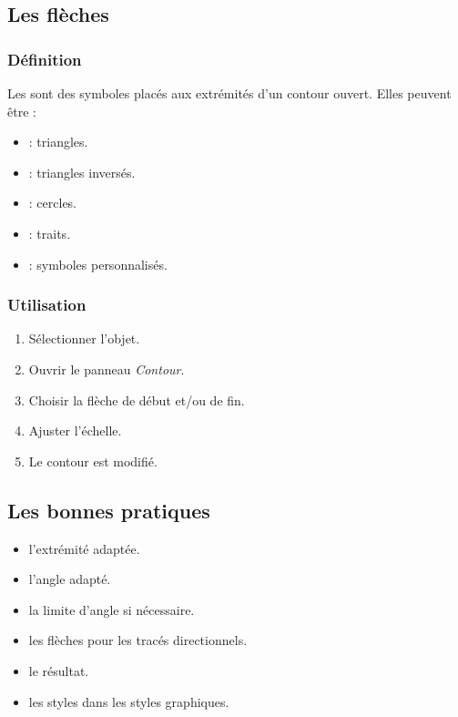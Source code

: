 \subsection{Les flèches}

\subsubsection{Définition}

Les  sont des symboles placés aux extrémités d'un contour ouvert. Elles peuvent être :

\begin{itemize}
    \item {} : triangles.
    \item {} : triangles inversés.
    \item {} : cercles.
    \item {} : traits.
    \item {} : symboles personnalisés.
\end{itemize}

\subsubsection{Utilisation}

\begin{enumerate}
    \item Sélectionner l'objet.
    \item Ouvrir le panneau \emph{Contour}.
    \item Choisir la flèche de début et/ou de fin.
    \item Ajuster l'échelle.
    \item Le contour est modifié.
\end{enumerate}

\subsection{Les bonnes pratiques}

\begin{itemize}
    \item {} l'extrémité adaptée.
    \item {} l'angle adapté.
    \item {} la limite d'angle si nécessaire.
    \item {} les flèches pour les tracés directionnels.
    \item {} le résultat.
    \item {} les styles dans les styles graphiques.
\end{itemize}

